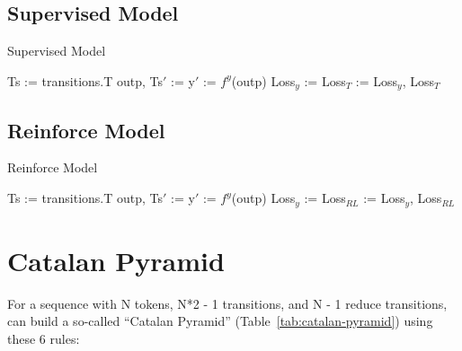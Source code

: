 \documentclass[11pt,a4paper]{article}
\begin{document}
\newpage

\subsection{Supervised Model}
\label{sec:algos-supervised}

\begin{algorithm}[H]
\caption{Supervised Model}\label{loss}
\begin{algorithmic}[1]

\State Ts := transitions.T
\State outp, Ts$'$ := 
\State y$'$ := $f^y$(outp)
\State Loss$_y$ := 
\State Loss$_T$ := 
\State \Return Loss$_y$, Loss$_T$
\EndFunction

\end{algorithmic}
\end{algorithm}

\subsection{Reinforce Model}
\label{sec:algos-rl}


\begin{algorithm}[H]
\caption{Reinforce Model}\label{rlloss}
\begin{algorithmic}[1]

\State Ts := transitions.T
\State outp, Ts$'$ := 
\State y$'$ := $f^y$(outp)
\State Loss$_y$ := 
\State Loss$_{RL}$ := 
\State \Return Loss$_y$, Loss$_{RL}$
\EndFunction

\end{algorithmic}
\end{algorithm}

\newpage

\section{Catalan Pyramid}
\label{sec:catalan}

For a sequence with N tokens, N*2 - 1 transitions, and N - 1 reduce transitions, can build a so-called ``Catalan Pyramid'' (Table~\ref{tab:catalan-pyramid}) using these 6 rules:
\end{document}
